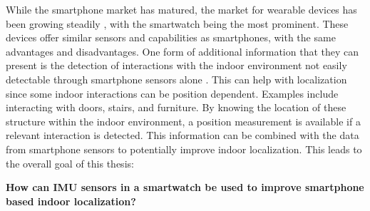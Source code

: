 While the smartphone market has matured, the market for wearable devices has been growing steadily \cite{jung2016consumer}, with the smartwatch being the most prominent. These devices offer similar sensors and capabilities as smartphones, with the same advantages and disadvantages. One form of additional information that they can present is the detection of interactions with the indoor environment not easily detectable through smartphone sensors alone \cite{Shoaib2015}. This can help with localization since some indoor interactions can be position dependent. Examples include interacting with doors, stairs, and furniture. By knowing the location of these structure within the indoor environment, a position measurement is available if a relevant interaction is detected. This information can be combined with the data from smartphone sensors to potentially improve indoor localization.
This leads to the overall goal of this thesis:

\textbf{How can IMU sensors in a smartwatch be used to improve smartphone based indoor localization?}




 


